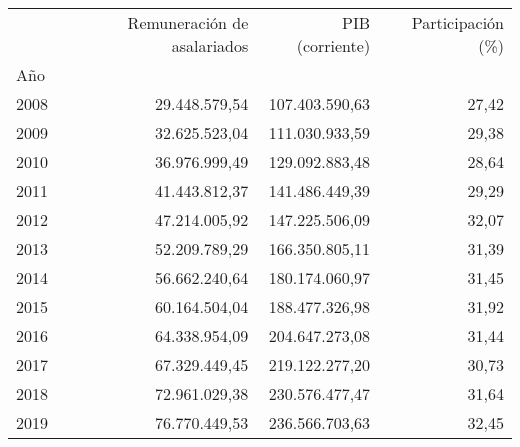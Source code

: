 \begin{tabular}{llll}
\cline{1-4}
\multicolumn{1}{c}{} &
  \multicolumn{1}{|r}{Remuneración de asalariados} &
  \multicolumn{1}{r}{PIB (corriente)} &
  \multicolumn{1}{r}{Participación (\%)} \\
\cline{1-4}
\multicolumn{1}{l}{Año} &
  \multicolumn{1}{|r}{} &
  \multicolumn{1}{r}{} &
  \multicolumn{1}{r}{} \\
\multicolumn{1}{l}{\hspace{1em}2008} &
  \multicolumn{1}{|r}{29.448.579,54} &
  \multicolumn{1}{r}{107.403.590,63} &
  \multicolumn{1}{r}{27,42} \\
\multicolumn{1}{l}{\hspace{1em}2009} &
  \multicolumn{1}{|r}{32.625.523,04} &
  \multicolumn{1}{r}{111.030.933,59} &
  \multicolumn{1}{r}{29,38} \\
\multicolumn{1}{l}{\hspace{1em}2010} &
  \multicolumn{1}{|r}{36.976.999,49} &
  \multicolumn{1}{r}{129.092.883,48} &
  \multicolumn{1}{r}{28,64} \\
\multicolumn{1}{l}{\hspace{1em}2011} &
  \multicolumn{1}{|r}{41.443.812,37} &
  \multicolumn{1}{r}{141.486.449,39} &
  \multicolumn{1}{r}{29,29} \\
\multicolumn{1}{l}{\hspace{1em}2012} &
  \multicolumn{1}{|r}{47.214.005,92} &
  \multicolumn{1}{r}{147.225.506,09} &
  \multicolumn{1}{r}{32,07} \\
\multicolumn{1}{l}{\hspace{1em}2013} &
  \multicolumn{1}{|r}{52.209.789,29} &
  \multicolumn{1}{r}{166.350.805,11} &
  \multicolumn{1}{r}{31,39} \\
\multicolumn{1}{l}{\hspace{1em}2014} &
  \multicolumn{1}{|r}{56.662.240,64} &
  \multicolumn{1}{r}{180.174.060,97} &
  \multicolumn{1}{r}{31,45} \\
\multicolumn{1}{l}{\hspace{1em}2015} &
  \multicolumn{1}{|r}{60.164.504,04} &
  \multicolumn{1}{r}{188.477.326,98} &
  \multicolumn{1}{r}{31,92} \\
\multicolumn{1}{l}{\hspace{1em}2016} &
  \multicolumn{1}{|r}{64.338.954,09} &
  \multicolumn{1}{r}{204.647.273,08} &
  \multicolumn{1}{r}{31,44} \\
\multicolumn{1}{l}{\hspace{1em}2017} &
  \multicolumn{1}{|r}{67.329.449,45} &
  \multicolumn{1}{r}{219.122.277,20} &
  \multicolumn{1}{r}{30,73} \\
\multicolumn{1}{l}{\hspace{1em}2018} &
  \multicolumn{1}{|r}{72.961.029,38} &
  \multicolumn{1}{r}{230.576.477,47} &
  \multicolumn{1}{r}{31,64} \\
\multicolumn{1}{l}{\hspace{1em}2019} &
  \multicolumn{1}{|r}{76.770.449,53} &
  \multicolumn{1}{r}{236.566.703,63} &
  \multicolumn{1}{r}{32,45} \\
\cline{1-4}
\end{tabular}

